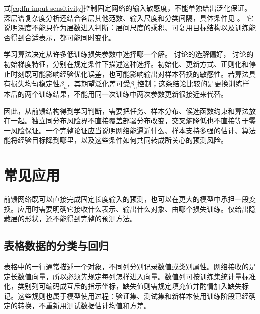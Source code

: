 式\eqref{eq:ffn-input-sensitivity}控制固定网络的输入敏感度，不能单独给出泛化保证。深层谱复杂度分析还结合各层其他范数、输入尺度和分类间隔，具体条件见
。
它说明深度不能只作为层数进入判断：层间尺度的乘积、可复用目标结构以及训练能否得到合适表示，都可能同时变化。

学习算法决定从许多低训练损失参数中选择哪一个解。
讨论的选解偏好，
讨论的初始梯度特征，分别在规定条件下描述这种选择。初始化、更新方式、正则化和停止时刻既可能影响经验优化误差，也可能影响输出对样本替换的敏感性。若算法具有损失均匀稳定性$\beta_n$，其期望泛化差可受$\beta_n$控制；这条结论比较的是更换训练样本后的两个训练结果，不能用同一次训练中两次参数更新很接近来代替。

因此，从前馈结构得到学习判断，需要把任务、样本分布、候选函数约束和算法放在一起。独立同分布风险界不直接覆盖部署分布改变，交叉熵降低也不直接等于零一风险保证。一个完整论证应当说明网络能逼近什么、样本支持多强的估计、算法能将经验目标降到哪里，以及这些条件如何共同转成所关心的预测风险。

\section{常见应用}
\label{sec:ffn-applications}

前馈网络既可以直接完成固定长度输入的预测，也可以在更大的模型中承担一段变换。应用时需要明确它接收什么表示、输出什么对象、由哪个损失训练。仅给出隐藏层的形状，还不能得到完整的预测方法。

\subsection{表格数据的分类与回归}
\label{sec:ffn-tabular}

表格中的一行通常描述一个对象，不同列分别记录数值或类别属性。网络接收的是定长数值向量，所以必须先规定每列怎样进入向量。数值列可按训练集统计量标准化，类别列可编码成互斥的指示坐标，缺失值则需规定填充值并酌情加入缺失标记。这些规则也属于模型使用过程：验证集、测试集和新样本使用训练阶段已经确定的转换，不重新用测试数据估计均值和方差。

